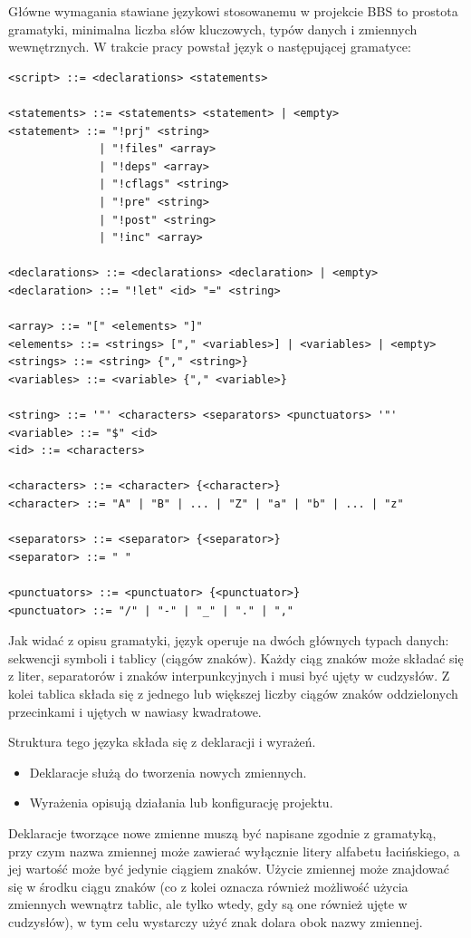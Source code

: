 Główne wymagania stawiane językowi stosowanemu w projekcie BBS to prostota gramatyki, minimalna liczba słów kluczowych, typów danych i zmiennych wewnętrznych. W trakcie pracy powstał język o następującej gramatyce:

\begin{lstlisting}[label=list:grammar,caption=Gramatyka języka projektu BBS,basicstyle=\footnotesize\ttfamily]
<script> ::= <declarations> <statements>

<statements> ::= <statements> <statement> | <empty>
<statement> ::= "!prj" <string>
              | "!files" <array>
              | "!deps" <array>
              | "!cflags" <string>
              | "!pre" <string>
              | "!post" <string>
              | "!inc" <array>

<declarations> ::= <declarations> <declaration> | <empty>
<declaration> ::= "!let" <id> "=" <string>

<array> ::= "[" <elements> "]"
<elements> ::= <strings> ["," <variables>] | <variables> | <empty>
<strings> ::= <string> {"," <string>}
<variables> ::= <variable> {"," <variable>}

<string> ::= '"' <characters> <separators> <punctuators> '"'
<variable> ::= "$" <id>
<id> ::= <characters>

<characters> ::= <character> {<character>}
<character> ::= "A" | "B" | ... | "Z" | "a" | "b" | ... | "z"

<separators> ::= <separator> {<separator>}
<separator> ::= " "

<punctuators> ::= <punctuator> {<punctuator>}
<punctuator> ::= "/" | "-" | "_" | "." | ","
\end{lstlisting}

Jak widać z opisu gramatyki, język operuje na dwóch głównych typach danych: sekwencji symboli i tablicy (ciągów znaków). Każdy ciąg znaków może składać się z liter, separatorów i znaków interpunkcyjnych i musi być ujęty w cudzysłów. Z kolei tablica składa się z jednego lub większej liczby ciągów znaków oddzielonych przecinkami i ujętych w nawiasy kwadratowe.

Struktura tego języka składa się z deklaracji i wyrażeń.
\begin{itemize}
    \item Deklaracje służą do tworzenia nowych zmiennych.
    \item Wyrażenia opisują działania lub konfigurację projektu.
\end{itemize}

Deklaracje tworzące nowe zmienne muszą być napisane zgodnie z gramatyką, przy czym nazwa zmiennej może zawierać wyłącznie litery alfabetu łacińskiego, a jej wartość może być jedynie ciągiem znaków. Użycie zmiennej może znajdować się w środku ciągu znaków (co z kolei oznacza również możliwość użycia zmiennych wewnątrz tablic, ale tylko wtedy, gdy są one również ujęte w cudzysłów), w tym celu wystarczy użyć znak dolara obok nazwy zmiennej.

